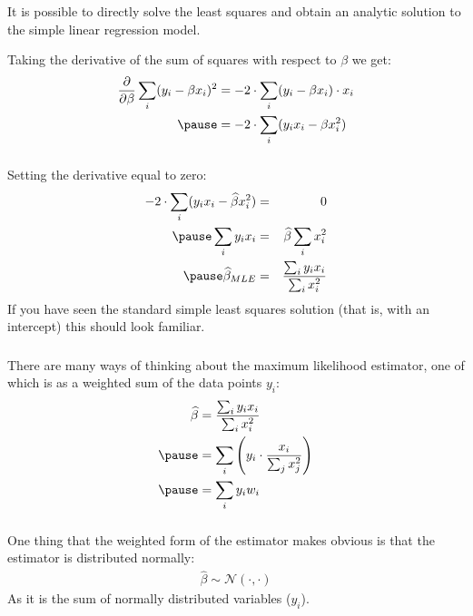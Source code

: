 \begin{frame}[fragile] \frametitle{}

It is possible to directly solve the least squares and obtain
an analytic solution to the simple linear regression model. \pause

Taking the derivative of the sum of squares with respect to
$\beta$ we get:
\begin{eqnarray*}
\frac{\partial}{\partial \beta} \sum_i (y_i - \beta x_i)^2
  &= -2 \cdot \sum_i ( y_i - \beta x_i) \cdot x_i \\ \pause
  &= -2 \cdot \sum_i ( y_i x_i - \beta x_i^2)
\end{eqnarray*}


\end{frame}

\begin{frame}[fragile] \frametitle{}

Setting the derivative equal to zero:
\begin{eqnarray*}
-2 \cdot \sum_i ( y_i x_i - \widehat{\beta} x_i^2) &=& 0 \\ \pause
\sum_i y_i x_i &=& \widehat{\beta} \sum_i x_i^2 \\ \pause
\widehat{\beta}_{MLE} &=& \frac{\sum_i y_i x_i}{\sum_i x_i^2}
\end{eqnarray*}
\pause If you have seen the standard simple least squares solution
(that is, with an intercept) this should look familiar.

\end{frame}


\begin{frame}[fragile] \frametitle{}

There are many ways of thinking about the maximum likelihood estimator,
one of which is as a weighted sum of the data points $y_i$:
\begin{align*}
\widehat{\beta} &= \frac{\sum_i y_i x_i}{\sum_i x_i^2} \\ \pause
&= \sum_i \left( y_i \cdot \frac{x_i}{\sum_j x_j^2} \right) \\ \pause
&= \sum_i y_i w_i
\end{align*}

\end{frame}

\begin{frame}[fragile] \frametitle{}

One thing that the weighted form of the estimator makes
obvious is that the estimator is distributed normally:
\begin{align*}
\widehat{\beta} \sim \mathcal{N} (\cdot, \cdot)
\end{align*}
As it is the sum of normally distributed variables ($y_i$).

\end{frame}

